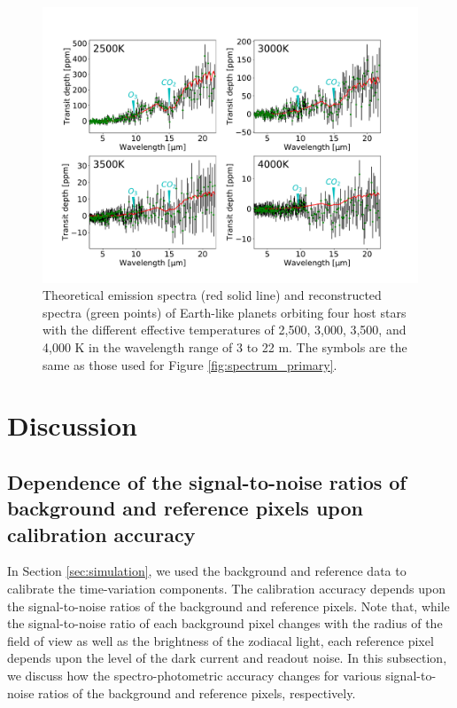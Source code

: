 \documentclass{aastex62}
\begin{document}
\begin{figure}[H]
\begin{center}
\includegraphics[width=12cm]{spectrum_secondary.pdf}
\caption{Theoretical emission spectra (red solid line) and reconstructed spectra (green points) of Earth-like planets orbiting four host stars with the different effective temperatures of 2,500, 3,000, 3,500, and 4,000 K in the wavelength range of 3 to 22 \textmu m. The symbols are the same as those used for Figure \ref{fig:spectrum_primary}. \label{fig:spectrum_secondary}}
\end{center}
\end{figure}


\section{Discussion} \label{sec:discussion}

\subsection{Dependence of the signal-to-noise ratios of background and reference pixels upon calibration accuracy} \label{subsec:dependency}

In Section \ref{sec:simulation}, we used the background and reference data to calibrate the time-variation components. The calibration accuracy depends upon the signal-to-noise ratios of the background and reference pixels. Note that, while the signal-to-noise ratio of each background pixel changes with the radius of the field of view as well as the brightness of the zodiacal light, each reference pixel depends upon the level of the dark current and readout noise. In this subsection, we discuss how the spectro-photometric accuracy changes for various signal-to-noise ratios of the background and reference pixels, respectively.
\end{document}
